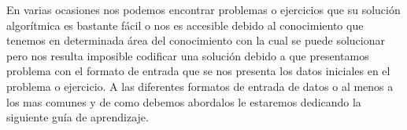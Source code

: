 En varias ocasiones nos podemos encontrar problemas o ejercicios que su solución algorítmica es bastante fácil o nos es accesible debido al conocimiento que tenemos en determinada área del conocimiento con la cual se puede solucionar pero nos resulta imposible codificar una solución debido a que presentamos problema con el formato de entrada que se nos presenta los datos iniciales en el problema o ejercicio. A las diferentes formatos de entrada de datos o al menos a los mas comunes y de como debemos abordalos le estaremos dedicando la siguiente guía de aprendizaje.  